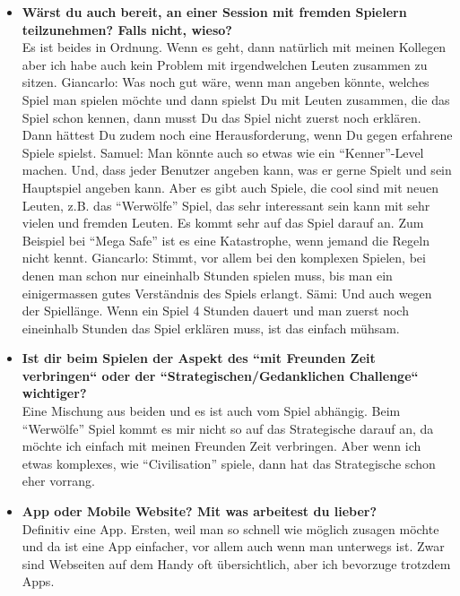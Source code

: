 \begin{appendix}
\begin{itemize}
    \item \textbf{Wärst du auch bereit, an einer Session mit fremden Spielern teilzunehmen? Falls nicht, wieso?}\\
    Es ist beides in Ordnung. Wenn es geht, dann natürlich mit meinen Kollegen aber ich habe auch kein Problem mit irgendwelchen Leuten zusammen zu sitzen.
    \newline
    Giancarlo: Was noch gut wäre, wenn man angeben könnte, welches Spiel man spielen möchte und dann spielst Du mit Leuten zusammen, die das Spiel schon kennen, dann musst Du das Spiel nicht zuerst noch erklären. Dann hättest Du zudem noch eine Herausforderung, wenn Du gegen erfahrene Spiele spielst.
    \newline
    Samuel: Man könnte auch so etwas wie ein “Kenner”-Level machen. Und, dass jeder Benutzer angeben kann, was er gerne Spielt und sein Hauptspiel angeben kann. Aber es gibt auch Spiele, die cool sind mit neuen Leuten, z.B. das “Werwölfe” Spiel, das sehr interessant sein kann mit sehr vielen und fremden Leuten. Es kommt sehr auf das Spiel darauf an. Zum Beispiel bei “Mega Safe” ist es eine Katastrophe, wenn jemand die Regeln nicht kennt.
    \newline
    Giancarlo: Stimmt, vor allem bei den komplexen Spielen, bei denen man schon nur eineinhalb Stunden spielen muss, bis man ein einigermassen gutes Verständnis des Spiels erlangt.
    \newline
    Sämi: Und auch wegen der Spiellänge. Wenn ein Spiel 4 Stunden dauert und man zuerst noch eineinhalb Stunden das Spiel erklären muss, ist das einfach mühsam.
    \item \textbf{Ist dir beim Spielen der Aspekt des ``mit Freunden Zeit verbringen`` oder der ``Strategischen/Gedanklichen Challenge`` wichtiger?}\\
    Eine Mischung aus beiden und es ist auch vom Spiel abhängig. Beim “Werwölfe” Spiel kommt es mir nicht so auf das Strategische darauf an, da möchte ich einfach mit meinen Freunden Zeit verbringen. Aber wenn ich etwas komplexes, wie “Civilisation” spiele, dann hat das Strategische schon eher vorrang.
    \item \textbf{App oder Mobile Website? Mit was arbeitest du lieber?}\\
    Definitiv eine App. Ersten, weil man so schnell wie möglich zusagen möchte und da ist eine App einfacher, vor allem auch wenn man unterwegs ist. Zwar sind Webseiten auf dem Handy oft übersichtlich, aber ich bevorzuge trotzdem Apps.
    \newline

\end{itemize}
\end{appendix}
